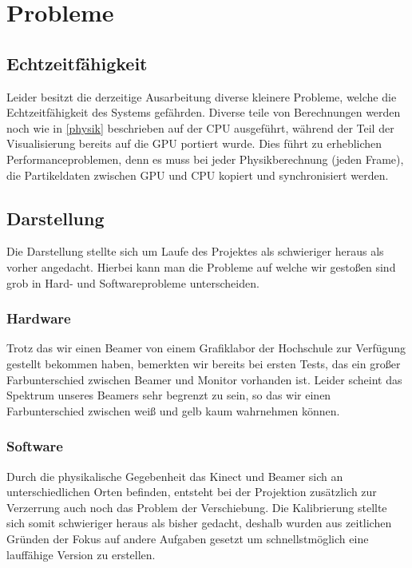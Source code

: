 \chapter{Probleme}
	\begin{Spacing}{\mylinespace}
	\section{Echtzeitfähigkeit}
	
		Leider besitzt die derzeitige Ausarbeitung diverse kleinere Probleme, welche die Echtzeitfähigkeit des Systems gefährden.
		Diverse teile von Berechnungen werden noch wie in \ref{physik} beschrieben auf der CPU ausgeführt, während der Teil der Visualisierung bereits auf die GPU portiert wurde.
		Dies führt zu erheblichen Performanceproblemen, denn es muss bei jeder Physikberechnung (jeden Frame), die Partikeldaten zwischen GPU und CPU kopiert und synchronisiert werden.
	\section{Darstellung}
		Die Darstellung stellte sich um Laufe des Projektes als schwieriger heraus als vorher angedacht.
		Hierbei kann man die Probleme auf welche wir gestoßen sind grob in Hard- und Softwareprobleme unterscheiden.
		\subsection{Hardware}
			Trotz das wir einen Beamer von einem Grafiklabor der Hochschule zur Verfügung gestellt bekommen haben, bemerkten wir bereits bei ersten Tests, das ein großer Farbunterschied zwischen Beamer und
			Monitor vorhanden ist. Leider scheint das Spektrum unseres Beamers sehr begrenzt zu sein, so das wir einen Farbunterschied zwischen weiß und gelb kaum wahrnehmen können.		
		\subsection{Software}
			Durch die physikalische Gegebenheit das Kinect und Beamer sich an unterschiedlichen Orten befinden, entsteht bei der Projektion zusätzlich zur Verzerrung auch noch das Problem der Verschiebung.
			Die Kalibrierung stellte sich somit schwieriger heraus als bisher gedacht, deshalb wurden aus zeitlichen Gründen der Fokus auf andere Aufgaben gesetzt um schnellstmöglich eine lauffähige Version zu erstellen.
	
\end{Spacing}
\newpage
\clearpage
